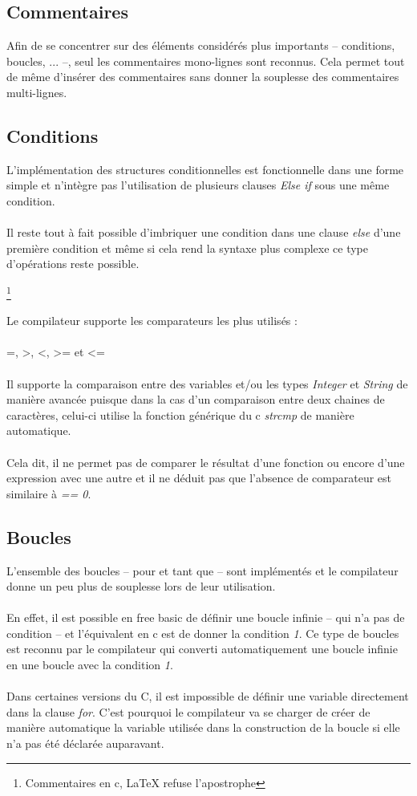 \documentclass{article}
\begin{document}
\subsection{Commentaires}
Afin de se concentrer sur des éléments considérés plus importants -- conditions, boucles, ... --, seul les
commentaires mono-lignes sont reconnus. Cela permet tout de même d'insérer des commentaires sans donner 
la souplesse des commentaires multi-lignes.

\subsection{Conditions}
L'implémentation des structures conditionnelles est fonctionnelle dans une forme simple et n'intègre pas
l'utilisation de plusieurs clauses \emph{Else if} sous une même condition.
\\\\
Il reste tout à fait possible d'imbriquer une condition dans une clause \emph{else} d'une première condition et
même si cela rend la syntaxe plus complexe ce type d'opérations reste possible.

\lstset{language=c,caption=Raccourci de syntaxe pour les conditions, upquote=true}
\footnote{Commentaires en c, LaTeX refuse l'apostrophe}

Le compilateur supporte les comparateurs les plus utilisés : 	
\\\\
=, >, <, >= et <=
\\\\
Il supporte la comparaison entre 
des variables et/ou les types \emph{Integer} et \emph{String} de manière avancée puisque dans la cas d'un comparaison
entre deux chaines de caractères, celui-ci utilise la fonction générique du c \emph{strcmp} de manière automatique.
\\\\
Cela dit, il ne permet pas de comparer le résultat d'une fonction ou encore d'une expression avec une autre et il 
ne déduit pas que l'absence de comparateur est similaire à \emph{== 0}.
\subsection{Boucles}
L'ensemble des boucles -- pour et tant que -- sont implémentés et le compilateur donne un peu plus 
de souplesse lors de leur utilisation.
\\\\
En effet, il est possible en free basic de définir une boucle infinie -- qui n'a pas de condition -- et 
l'équivalent en c est de donner la condition \emph{1}. Ce type de boucles est reconnu par le 
compilateur qui converti automatiquement une boucle infinie en une boucle avec la condition \emph{1}.
\\\\
Dans certaines versions du C, il est impossible de définir une variable directement dans la clause \emph{for}.
C'est pourquoi le compilateur va se charger de créer de manière automatique la variable utilisée dans 
la construction de la boucle si elle n'a pas été déclarée auparavant.
	
\end{document}

